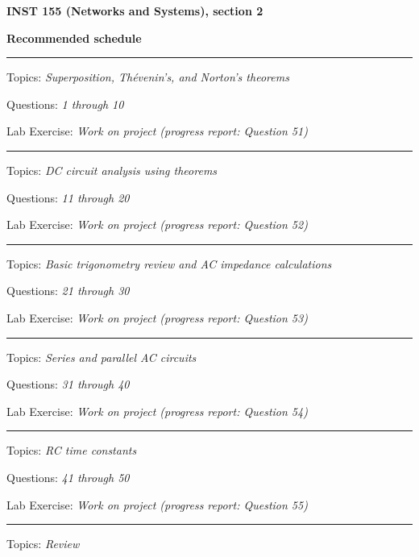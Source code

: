 
\centerline{\bf INST 155 (Networks and Systems), section 2} \bigskip 
 
\vskip 10pt

\noindent
{\bf Recommended schedule}

\vskip 5pt

\hrule \vskip 5pt
\noindent
{}

\hskip 10pt Topics: {\it Superposition, Th\'evenin's, and Norton's theorems}
 
\hskip 10pt Questions: {\it 1 through 10}
 
\hskip 10pt Lab Exercise: {\it Work on project (progress report: Question 51)}
 
\vskip 10pt
\hrule \vskip 5pt
\noindent
{}

\hskip 10pt Topics: {\it DC circuit analysis using theorems}
 
\hskip 10pt Questions: {\it 11 through 20}
 
\hskip 10pt Lab Exercise: {\it Work on project (progress report: Question 52)}
 
\vskip 10pt
\hrule \vskip 5pt
\noindent
{}

\hskip 10pt Topics: {\it Basic trigonometry review and AC impedance calculations}
 
\hskip 10pt Questions: {\it 21 through 30}
 
\hskip 10pt Lab Exercise: {\it Work on project (progress report: Question 53)}
 
\vskip 10pt
\hrule \vskip 5pt
\noindent
{}

\hskip 10pt Topics: {\it Series and parallel AC circuits}
 
\hskip 10pt Questions: {\it 31 through 40}
 
\hskip 10pt Lab Exercise: {\it Work on project (progress report: Question 54)}
 
\vskip 10pt
\hrule \vskip 5pt
\noindent
{}

\hskip 10pt Topics: {\it RC time constants}
 
\hskip 10pt Questions: {\it 41 through 50}
 
\hskip 10pt Lab Exercise: {\it Work on project (progress report: Question 55)}
 
\vskip 10pt
\hrule \vskip 5pt
\noindent
{}

\hskip 10pt Topics: {\it Review}
 
